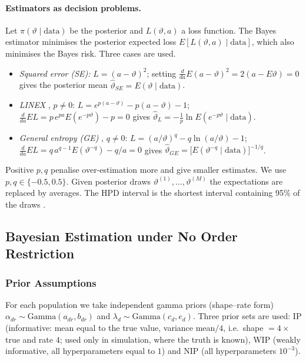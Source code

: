 \documentclass[a4paper,11pt]{article}
\begin{document}
\paragraph{Estimators as decision problems.} Let $\pi(\vartheta\mid\text{data})$ be the posterior and $L(\vartheta,a)$ a loss function. The Bayes estimator minimises the posterior expected loss $E[L(\vartheta,a)\mid\text{data}]$, which also minimises the Bayes risk. Three cases are used.
\begin{itemize}
\item \emph{Squared error (SE):} $L=(a-\vartheta)^2$; setting $\frac{d}{da}E(a-\vartheta)^2=2(a-E\vartheta)=0$ gives the posterior mean $\hat\vartheta_{SE}=E(\vartheta\mid\text{data})$.
\item \emph{LINEX} \cite{varian1975}, $p\ne0$: $L=e^{p(a-\vartheta)}-p(a-\vartheta)-1$; $\frac{d}{da}E L=p\,e^{pa}E(e^{-p\vartheta})-p=0$ gives $\hat\vartheta_{L}=-\frac1p\ln E(e^{-p\vartheta}\mid\text{data})$.
\item \emph{General entropy (GE)} \cite{calabria1996}, $q\ne0$: $L=(a/\vartheta)^q-q\ln(a/\vartheta)-1$; $\frac{d}{da}EL=q\,a^{q-1}E(\vartheta^{-q})-q/a=0$ gives $\hat\vartheta_{GE}=\big[E(\vartheta^{-q}\mid\text{data})\big]^{-1/q}$.
\end{itemize}
Positive $p,q$ penalise over-estimation more and give smaller estimates. We use $p,q\in\{-0.5,0.5\}$. Given posterior draws $\vartheta^{(1)},\dots,\vartheta^{(M)}$ the expectations are replaced by averages. The HPD interval is the shortest interval containing 95\% of the draws \cite{chen1999}.

\subsection{Bayesian Estimation under No Order Restriction}
\subsubsection{Prior Assumptions}
For each population we take independent gamma priors (shape--rate form) $\alpha_{dr}\sim\mathrm{Gamma}(a_{dr},b_{dr})$ and $\lambda_d\sim\mathrm{Gamma}(c_d,e_d)$. Three prior sets are used: IP (informative: mean equal to the true value, variance mean$/4$, i.e.\ shape $=4\times$true and rate $4$; used only in simulation, where the truth is known), WIP (weakly informative, all hyperparameters equal to $1$) and NIP (all hyperparameters $10^{-3}$).
\end{document}
